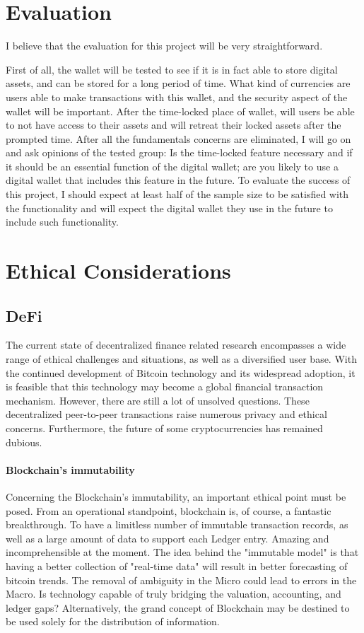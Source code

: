 \documentclass[10pt,twocolumn]{article}
\begin{document}
\section{Evaluation}
I believe that the evaluation for this project will be very straightforward.

First of all, the wallet will be tested to see if it is in fact able to store digital assets, and can be stored for a long period of time. What kind of currencies are users able to make transactions with this wallet, and the security aspect of the wallet will be important. After the time-locked place of wallet, will users be able to not have access to their assets and will retreat their locked assets after the prompted time. After all the fundamentals concerns are eliminated, I will go on and ask opinions of the tested group: Is the time-locked feature necessary and if it should be an essential function of the digital wallet; are you likely to use a digital wallet that includes this feature in the future.
	To evaluate the success of this project, I should expect at least half of the sample size to be satisfied with the functionality and will expect the digital wallet they use in the future to include such functionality.



\section{Ethical Considerations}

\subsection{DeFi}
The current state of decentralized finance related research encompasses a wide range of ethical challenges and situations, as well as a diversified user base. With the continued development of Bitcoin technology and its widespread adoption, it is feasible that this technology may become a global financial transaction mechanism. However, there are still a lot of unsolved questions. These decentralized peer-to-peer transactions raise numerous privacy and ethical concerns. Furthermore, the future of some cryptocurrencies has remained dubious.\cite{FabianDeFi}
\paragraph{Blockchain's immutability}
Concerning the Blockchain's immutability, an important ethical point must be posed. From an operational standpoint, blockchain is, of course, a fantastic breakthrough. To have a limitless number of immutable transaction records, as well as a large amount of data to support each Ledger entry. Amazing and incomprehensible at the moment. The idea behind the "immutable model" is that having a better collection of "real-time data" will result in better forecasting of bitcoin trends. The removal of ambiguity in the Micro could lead to errors in the Macro. Is technology capable of truly bridging the valuation, accounting, and ledger gaps? Alternatively, the grand concept of Blockchain may be destined to be used solely for the distribution of information.
\end{document}
